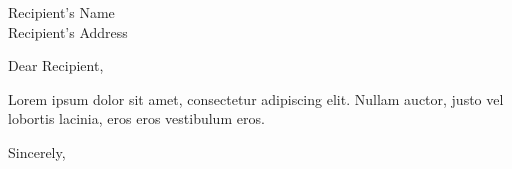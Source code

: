 \documentclass{scrlttr2}
\begin{document}
    \begin{letter}{Recipient's Name \\ Recipient's Address}
        \opening{Dear Recipient,}

        Lorem ipsum dolor sit amet, consectetur adipiscing elit. Nullam auctor, justo vel lobortis lacinia, eros eros vestibulum eros.

        \closing{Sincerely,}
    \end{letter}
\end{document}
